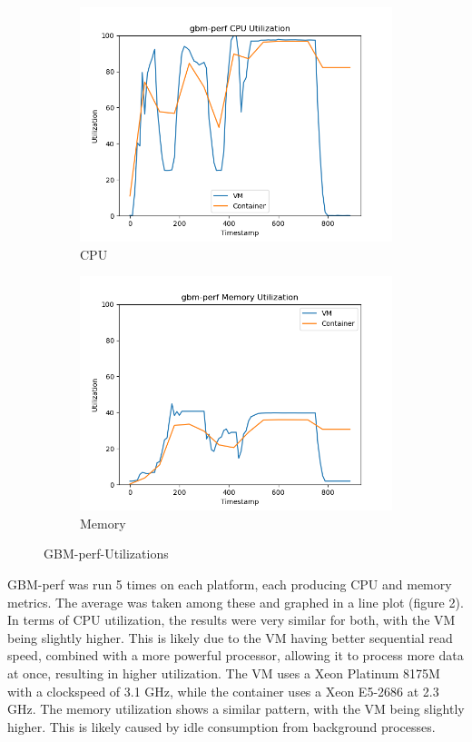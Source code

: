 \documentclass[11pt]{article}
\begin{document}
\begin{figure}[hbt!]
\centering
\begin{subfigure}{.5\textwidth}
  \centering
  \includegraphics[width=1.1\linewidth]{gbmperf_cpu_util.png}
  \caption{CPU}
  \label{fig:gbmperfu1}
\end{subfigure}%
\begin{subfigure}{.5\textwidth}
  \centering
  \includegraphics[width=1.1\linewidth]{gbmperf_mem_util.png}
  \caption{Memory}
  \label{fig:gbmperfu2}
\end{subfigure}
\caption{GBM-perf-Utilizations}
\label{fig:gbmperfutilizations}
\end{figure}

GBM-perf was run 5 times on each platform, each producing CPU and memory metrics. The average was taken among these and graphed in a line plot (figure 2). In terms of CPU utilization, the results were very similar for both, with the VM being slightly higher. This is likely due to the VM having better sequential read speed, combined with a more powerful processor, allowing it to process more data at once, resulting in higher utilization. The VM uses a Xeon Platinum 8175M with a clockspeed of 3.1 GHz, while the container uses a Xeon E5-2686 at 2.3 GHz. The memory utilization shows a similar pattern, with the VM being slightly higher. This is likely caused by idle consumption from background processes.
\end{document}
